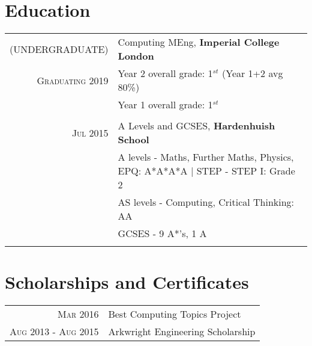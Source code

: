 \documentclass[a4paper,10pt]{article} %
\begin{document}
\section{Education}

\begin{tabular}{rl}	
\textsc{(UNDERGRADUATE)} & Computing MEng, \textbf{Imperial College London}\\
\textsc{Graduating 2019} 
& \footnotesize{Year 2 overall grade: 1$^{st}$ (Year 1+2 avg 80\%)} \\
& \footnotesize{Year 1 overall grade: 1$^{st}$} \\
& \\


\textsc{Jul 2015} & A Levels and GCSES, \textbf{Hardenhuish School} \\
& \footnotesize{A levels - Maths, Further Maths, Physics, EPQ: A*A*A*A  | STEP - STEP I: Grade 2 }\\
& \footnotesize{AS levels - Computing, Critical Thinking: AA}\\
& \footnotesize{GCSES - 9 A*'s, 1 A}\\
&\\




\end{tabular}


\section{Scholarships and Certificates}

\begin{tabular}{rl}
\textsc{Mar 2016} & Best Computing Topics Project \\
\textsc{Aug 2013 - Aug 2015} & Arkwright Engineering Scholarship \\
\end{tabular}

\end{document}
